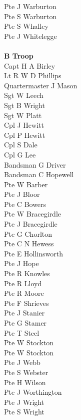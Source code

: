 \begin{multicols}{3}
  Pte J Warburton \\
  Pte S Warburton \\
  Pte S Whalley \\
  Pte J Whitelegge \\
  \\
  \textbf{B Troop} \\
  Capt H A Birley \\
  Lt R W D Phillips \\
  Quartermaster J Mason \\
  Sgt W Leech \\
  Sgt B Wright \\
  Sgt W Platt \\
  Cpl J Hewitt \\
  Cpl P Hewitt \\
  Cpl S Dale \\
  Cpl G Lee \\
  Bandsman G Driver \\
  Bandsman C Hopewell \\
  Pte W Barber \\
  Pte J Bloor \\
  Pte C Bowers \\
  Pte W Bracegirdle \\
  Pte J Bracegirdle \\
  Pte G Chorlton \\
  Pte C N Hewess \\
  Pte E Hollinsworth \\
  Pte J Hope \\
  Pte R Knowles \\
  Pte R Lloyd \\
  Pte R Moore \\
  Pte F Shrieves \\
  Pte J Stanier \\
  Pte G Stamer \\
  Pte T Steel \\
  Pte W Stockton \\
  Pte W Stockton \\
  Pte J Webb \\
  Pte S Webster \\
  Pte H Wilson \\
  Pte J Worthington \\
  Pte J Wright \\
  Pte S Wright \\
\end{multicols}

\vspace*{20mm}
  
